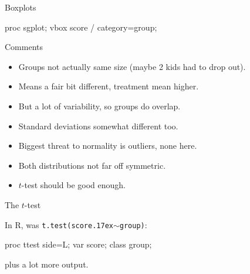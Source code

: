 \documentclass[unknownkeysallowed]{beamer}\usepackage[]{graphicx}\usepackage[]{color}
\newcommand{\mytilde}{\raise.17ex\hbox{$\scriptstyle\mathtt{\sim}$}}
\begin{document}
\begin{frame}[fragile]{Boxplots}

\begin{Sascode}[store=ifx]
  proc sgplot;
    vbox score / category=group;
\end{Sascode}


  
\end{frame}

\begin{frame}{Comments}

\begin{itemize}
\item Groups not actually same size (maybe 2 kids had to drop out).
\item Means a fair bit different, treatment mean higher.
\item But a lot of variability, so groups do overlap.
\item Standard deviations somewhat different too.
  \item Biggest threat to normality is outliers, none here.
  \item Both distributions not far off symmetric.
  \item $t$-test should be good enough.
  \end{itemize}
  
\end{frame}

\begin{frame}[fragile]{The $t$-test}

  In R, was \texttt{t.test(score\mytilde group)}:
  
\begin{Sascode}[store=ihy]
  proc ttest side=L;
    var score;
    class group;
\end{Sascode}


plus a lot more output. 



\end{frame}
\end{document}
